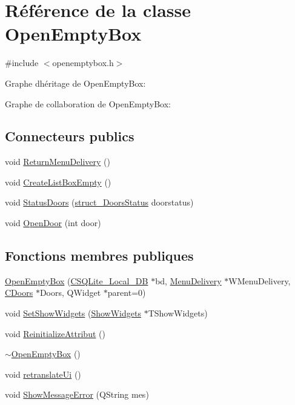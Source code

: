 \hypertarget{class_open_empty_box}{}\section{Référence de la classe Open\+Empty\+Box}
\label{class_open_empty_box}


{\ttfamily \#include $<$openemptybox.\+h$>$}



Graphe d\textquotesingle{}héritage de Open\+Empty\+Box\+:


Graphe de collaboration de Open\+Empty\+Box\+:
\subsection*{Connecteurs publics}
\begin{DoxyCompactItemize}
\item 
void \hyperlink{class_open_empty_box_a15b7f6583b80d4fc3aeb7d80b986e9a7}{Return\+Menu\+Delivery} ()
\item 
void \hyperlink{class_open_empty_box_afd5c75107a4912a1edb7e19258c73c6f}{Create\+List\+Box\+Empty} ()
\item 
void \hyperlink{class_open_empty_box_aea83e875ed499d5c0afeea80dd840e34}{Status\+Doors} (\hyperlink{structstruct___doors_status}{struct\+\_\+\+Doors\+Status} doorstatus)
\item 
void \hyperlink{class_open_empty_box_ac0cd8e653c4faf6891cb2f5493f2745c}{Open\+Door} (int door)
\end{DoxyCompactItemize}
\subsection*{Fonctions membres publiques}
\begin{DoxyCompactItemize}
\item 
\hyperlink{class_open_empty_box_ad6794eab79d6bd8b9c4b26043cde493b}{Open\+Empty\+Box} (\hyperlink{class_c_s_q_lite___local___d_b}{C\+S\+Q\+Lite\+\_\+\+Local\+\_\+\+D\+B} $\ast$bd, \hyperlink{class_menu_delivery}{Menu\+Delivery} $\ast$W\+Menu\+Delivery, \hyperlink{class_c_doors}{C\+Doors} $\ast$Doors, Q\+Widget $\ast$parent=0)
\item 
void \hyperlink{class_open_empty_box_a01a6e123ea35c6caa6668e07506538e8}{Set\+Show\+Widgets} (\hyperlink{class_show_widgets}{Show\+Widgets} $\ast$T\+Show\+Widgets)
\item 
void \hyperlink{class_open_empty_box_a9535da0ecd3ff8cddfaa2881b44a3b0b}{Reinitialize\+Attribut} ()
\item 
\hyperlink{class_open_empty_box_a7c34e7b5a091f58da25fe4667e18c38c}{$\sim$\+Open\+Empty\+Box} ()
\item 
void \hyperlink{class_open_empty_box_ac82ae3574a6a49dc9bb7c602b198a410}{retranslate\+Ui} ()
\item 
void \hyperlink{class_open_empty_box_a608eac7cf60f57f914d38a6f431584f1}{Show\+Message\+Error} (Q\+String mes)
\end{DoxyCompactItemize}


